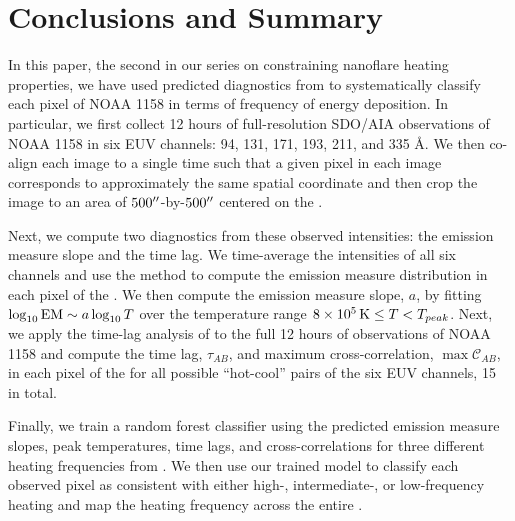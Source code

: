 \section{Conclusions and Summary}\label{sec:conclusions}

In this paper, the second in our series on constraining nanoflare heating properties, we have used predicted diagnostics from  to systematically classify each pixel of \AR{} NOAA 1158 in terms of frequency of energy deposition.
In particular, we first collect 12 hours of full-resolution SDO/AIA observations of NOAA 1158 in six EUV channels: 94, 131, 171, 193, 211, and 335 \AA.
We then co-align each image to a single time such that a given pixel in each image corresponds to approximately the same spatial coordinate and then crop the image to an area of $500\mbox{$^{\prime\prime}$}$-by-$500\mbox{$^{\prime\prime}$}$ centered on the \AR{}.

Next, we compute two diagnostics from these observed intensities: the emission measure slope and the time lag.
We time-average the intensities of all six channels and use the method \citet{hannah_differential_2012} to compute the emission measure distribution in each pixel of the \AR{}.
We then compute the emission measure slope, $a$, by fitting $\log_{10}\textup{EM}\sim a\log_{10}T$ over the temperature range $8\times10^5\,\textup{K}\le T < T_{peak}$. 
Next, we apply the time-lag analysis of \citet{viall_evidence_2012} to the full 12 hours of observations of NOAA 1158 and compute the time lag, $\tau_{AB}$, and maximum cross-correlation, $\max\mathcal{C}_{AB}$, in each pixel of the \AR{} for all possible ``hot-cool'' pairs of the six EUV channels, 15 in total.

Finally, we train a random forest classifier using the predicted emission measure slopes, peak temperatures, time lags, and cross-correlations for three different heating frequencies from .
We then use our trained model to classify each observed pixel as consistent with either high-, intermediate-, or low-frequency heating and map the heating frequency across the entire \AR{}.

